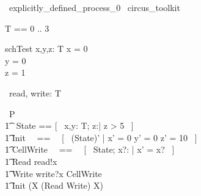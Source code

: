 \begin{zsection}
  \SECTION\ explicitly\_defined\_process\_0 \parents\ circus\_toolkit
\end{zsection}

\begin{zed}
	T == 0 .. 3 
\end{zed}

\begin{schema}{schTest}
    x,y,z: T 
\where
    x = 0 \\
    y = 0 \\
    z = 1 
\end{schema}

\begin{circus}
	\circchannel\ read, write: T \\
\end{circus}

\begin{circus}
    \circprocess\ P \circdef \circbegin \\
        \t1 \circstate\ State == [~ x,y: T; z:\nat | z > 5 ~] \\
        \t1 Init ~~==~~ [~ (State)' | x' = 0 \land y' = 0 \land z' = 10 ~] \\
        \t1 CellWrite ~~==~~ [~ \Delta State; x?: \nat | x' = x? ~] \\
        \t1 Read \circdef read!x \then \Skip \\
        \t1 Write \circdef write?x \then \lschexpract CellWrite \rschexpract \\
        \t1 \circspot \lschexpract Init \rschexpract \circseq (\circmu X \circspot (Read \extchoice Write) \circseq X) \\ 
	\circend
\end{circus}

